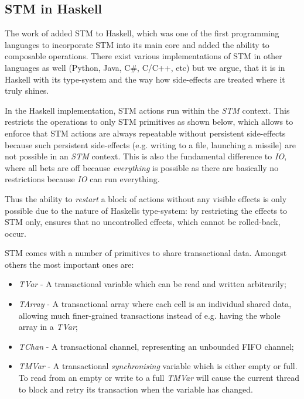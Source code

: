 \subsection{STM in Haskell}
The work of \cite{harris_composable_2005, harris_transactional_2006} added STM to Haskell, which was one of the first programming languages to incorporate STM into its main core and added the ability to composable operations. There exist various implementations of STM in other languages as well (Python, Java, C\#, C/C++, etc) but we argue, that it is in Haskell with its type-system and the way how side-effects are treated where it truly shines.

In the Haskell implementation, STM actions run within the \textit{STM} context. This restricts the operations to only STM primitives as shown below, which allows to enforce that STM actions are always repeatable without persistent side-effects because such persistent side-effects (e.g. writing to a file, launching a missile) are not possible in an \textit{STM} context. This is also the fundamental difference to  \textit{IO}, where all bets are off because \textit{everything} is possible as there are basically no restrictions because \textit{IO} can run everything.

Thus the ability to \textit{restart} a block of actions without any visible effects is only possible due to the nature of Haskells type-system: by restricting the effects to STM only, ensures that no uncontrolled effects, which cannot be rolled-back, occur.

STM comes with a number of primitives to share transactional data. Amongst others the most important ones are:

\begin{itemize}
	\item \textit{TVar} - A transactional variable which can be read and written arbitrarily;
	\item \textit{TArray} - A transactional array where each cell is an individual shared data, allowing much finer-grained transactions instead of e.g. having the whole array in a \textit{TVar};
	\item \textit{TChan} - A transactional channel, representing an unbounded FIFO channel;
	\item \textit{TMVar} - A transactional \textit{synchronising} variable which is either empty or full. To read from an empty or write to a full \textit{TMVar} will cause the current thread to block and retry its transaction when the variable has changed.
\end{itemize}

